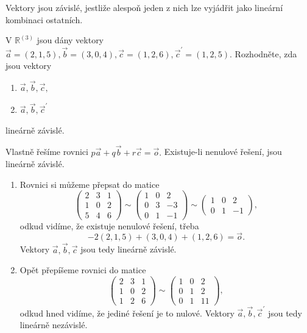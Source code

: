 \begin{veta}
    Vektory jsou závislé, jestliže alespoň jeden z nich lze vyjádřit jako lineární
    kombinaci ostatních.
\end{veta}

\begin{priklad}
V $\mathbb R^{(3)}$ jsou dány vektory $\vec a = (2,1,5), \vec b = (3,0,4), \vec c=(1,2,6),
\vec c^\prime = (1,2,5).$ Rozhodněte, zda jsou vektory
\begin{enumerate}[$a.$]
\item $\vec a, \vec b,\vec c,$
\item $\vec a, \vec b,\vec c^\prime$
\end{enumerate}
lineárně závislé.
\end{priklad}

\begin{reseni}
Vlastně řešíme rovnici $p\vec a + q\vec b + r\vec c= \vec o.$ Existuje-li nenulové
řešení, jsou lineárně závislé.
\begin{enumerate}[$a.$]
	\item Rovnici si můžeme přepsat do matice
	$$
 \begin{pmatrix}
		2 & 3 & 1 \\
		1 & 0 & 2 \\
		5 & 4 & 6
 \end{pmatrix} \sim \begin{pmatrix}
	1 & 0 & 2 \\
	0 & 3 & -3 \\
	0 & 1 & -1
 \end{pmatrix} \sim \begin{pmatrix}
	1 & 0 & 2 \\
	0 & 1 & -1
 \end{pmatrix},
	$$
	odkud vidíme, že existuje nenulové řešení, třeba
	$$
	    -2(2,1,5) + (3,0,4) + (1,2,6) = \vec o.
	$$
	Vektory $\vec a, \vec b, \vec c$ jsou tedy lineárně závislé.
	\item Opět přepíšeme rovnici do matice
	$$
 \begin{pmatrix}
 2 & 3 & 1 \\
		1 & 0 & 2 \\
		1 & 2&  6
 \end{pmatrix} \sim \begin{pmatrix}
	1 & 0 & 2 \\
	0 & 1 & 2 \\
	0 & 1 & 11
 \end{pmatrix},
	$$
	odkud hned vidíme, že jediné řešení je to nulové. Vektory $\vec a, \vec b, \vec c^\prime$ jsou tedy lineárně
	nezávislé.
\end{enumerate}
\end{reseni}

